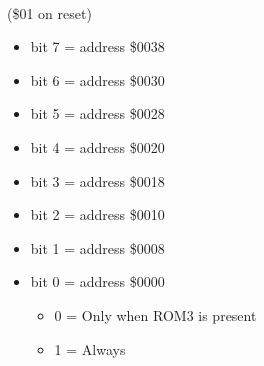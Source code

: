 \\
(\$01 on reset)
\begin{itemize}
\item bit 7 = address \$0038
\item bit 6 = address \$0030
\item bit 5 = address \$0028
\item bit 4 = address \$0020
\item bit 3 = address \$0018
\item bit 2 = address \$0010
\item bit 1 = address \$0008
\item bit 0 = address \$0000
\begin{itemize}
\item[] 0 = Only when ROM3 is present
\item[] 1 = Always
\end{itemize}
\end{itemize}


